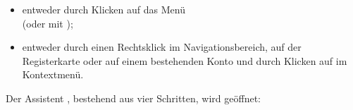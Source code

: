 \begin{itemize}
	\item entweder durch Klicken auf das Menü \\
	(oder mit );
	\item entweder durch einen Rechtsklick im Navigationsbereich, auf der Registerkarte  oder auf einem bestehenden Konto und durch Klicken auf  im Kontextmenü.
\end{itemize}
Der Assistent , bestehend aus vier Schritten, wird geöffnet:
